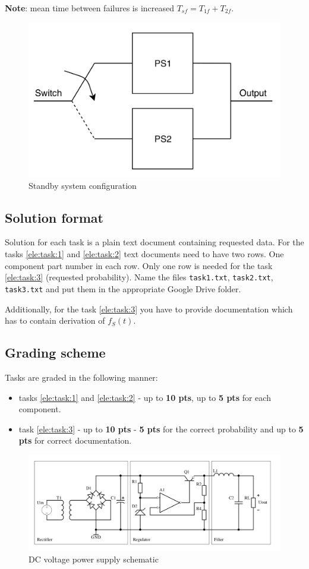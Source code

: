 \documentclass{article}
\begin{document}
\textbf{Note}: mean time between failures is increased $T_{sf} = 
T_{1f} + T_{2f}$. 

\begin{figure}[h!]
	\centering
	\includegraphics[width=\linewidth]{standby.png}
	\caption{Standby system configuration}
	\label{fig:psc}
\end{figure}

\newpage

\subsection{Solution format}
Solution for each task is a plain text document containing requested data. For
the tasks \ref{ele:task:1} and \ref{ele:task:2} text documents need to have 
two rows. One component part number in each row. Only one row is needed for the 
task \ref{ele:task:3} (requested probability). Name the files 
\texttt{task1.txt}, \texttt{task2.txt}, \texttt{task3.txt} and put them in 
the appropriate Google Drive folder.

Additionally, for the task \ref{ele:task:3} you have to provide documentation
which has to contain derivation of $f_S(t)$.

\subsection{Grading scheme}
Tasks are graded in the following manner:
\begin{itemize}
	\item tasks \ref{ele:task:1} and \ref{ele:task:2} - up to \textbf{10 pts}, 
	up to \textbf{5 pts} for each component.
	\item task \ref{ele:task:3} - up to \textbf{10 pts} - \textbf{5 pts} for 
	the 
	correct probability and up to \textbf{5 pts} for correct documentation.
\end{itemize}

\begin{figure}
	\centering
	\includegraphics[width=\linewidth]{reg.png}
	\caption{DC voltage power supply schematic}
	\label{fig:schematic}
\end{figure}






	
\end{document}
